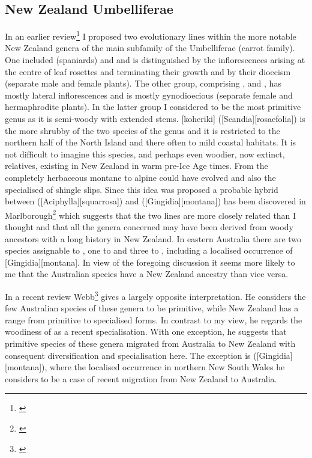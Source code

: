 \subsection{New Zealand Umbelliferae}

In an earlier review\footnote{\cite{dawson1971relationships}} I proposed two evolutionary lines within the more notable New Zealand genera of the main subfamily of the Umbelliferae (carrot family).
One included  (spaniards) and  and is distinguished by the inflorescences arising at the centre of leaf rosettes and terminating their growth and by their dioecism (separate male and female plants).
The other group, comprising ,  and , has mostly lateral inflorescences and is mostly gynodioecious (separate female and hermaphrodite plants).
In the latter group I considered  to be the most primitive genus as it is semi-woody with extended stems.
[koheriki] ([Scandia][rosaefolia]) is the more shrubby of the two species of the genus and it is restricted to the northern half of the North Island and there often to mild coastal habitats.
It is not difficult to imagine this species, and perhaps even woodier, now extinct, relatives, existing in New Zealand in warm pre-Ice Age times.
From  the completely herbaceous montane to alpine  could have evolved and also the specialised  of shingle slips.
Since this idea was proposed a probable hybrid between  ([Aciphylla][squarrosa]) and  ([Gingidia][montana]) has been discovered in Marlborough\footnote{\cite{webb1984natural}} which suggests that the two lines are more closely related than I thought and that all the genera concerned may have been derived from woody ancestors with a long history in New Zealand.
In eastern Australia there are two species assignable to , one to  and three to , including a localised occurrence of [Gingidia][montana].
In view of the foregoing discussion it seems more likely to me that the Australian species have a New Zealand ancestry than vice versa.

In a recent review Webb\footnote{\cite{webb1986breeding}} gives a largely opposite interpretation.
He considers the few Australian species of these genera to be primitive, while New Zealand has a range from primitive to specialised forms.
In contrast to my view, he regards the woodiness of  as a recent specialisation.
With one exception, he suggests that primitive species of these genera migrated from Australia to New Zealand with consequent diversification and specialisation here.
The exception is  ([Gingidia][montana]), where the localised occurrence in northern New South Wales he considers to be a case of recent migration from New Zealand to Australia.

